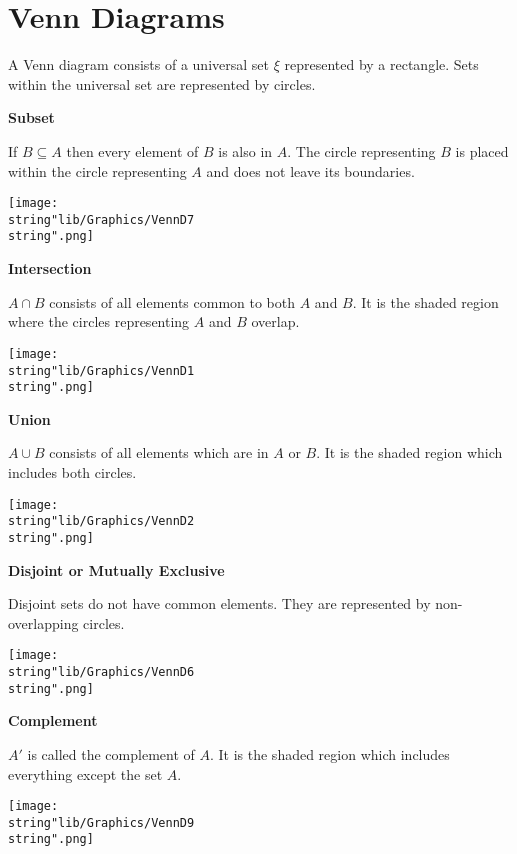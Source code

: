 \documentclass[11pt,a4paper]{book}
\begin{document}
\newpage
\section{Venn Diagrams}

A Venn diagram consists of a universal set $\xi$ represented by a
rectangle. Sets within the universal set are represented by circles.

\textbf{\large{}Subset}{\large\par}

If $B\subseteq A$ then every element of $B$ is also in $A$. The
circle representing $B$ is placed within the circle representing
$A$ and does not leave its boundaries.
\begin{center}
\texttt{[image: \\string"lib/Graphics/VennD7\\string".png]}
\par\end{center}

\textbf{\large{}Intersection}{\large\par}

$A\cap B$ consists of all elements common to both $A$ and $B$.
It is the shaded region where the circles representing $A$ and $B$
overlap.
\begin{center}
\texttt{[image: \\string"lib/Graphics/VennD1\\string".png]}
\par\end{center}

\textbf{\large{}Union}{\large\par}

$A\cup B$ consists of all elements which are in $A$ or $B$. It
is the shaded region which includes both circles.
\begin{center}
\texttt{[image: \\string"lib/Graphics/VennD2\\string".png]}
\par\end{center}

\textbf{\large{}Disjoint or Mutually Exclusive}{\large\par}

Disjoint sets do not have common elements. They are represented by
non-overlapping circles.
\begin{center}
\texttt{[image: \\string"lib/Graphics/VennD6\\string".png]}
\par\end{center}

\textbf{\large{}Complement}{\large\par}
$A'$ is called the complement of $A$. It is the shaded region which includes everything except the set $A$.
\begin{center}
\texttt{[image: \\string"lib/Graphics/VennD9\\string".png]}
\par\end{center}
\end{document}
